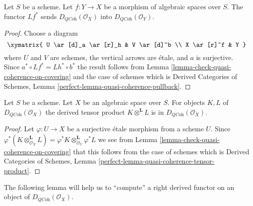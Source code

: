 \begin{lemma}
\label{lemma-quasi-coherence-pullback}
Let $S$ be a scheme.
Let $f : Y \to X$ be a morphism of algebraic spaces over $S$.
The functor $Lf^*$ sends $D_{\textit{QCoh}}(\mathcal{O}_X)$
into $D_{\textit{QCoh}}(\mathcal{O}_Y)$.
\end{lemma}

\begin{proof}
Choose a diagram
$$
\xymatrix{
U \ar[d]_a \ar[r]_h & V \ar[d]^b \\
X \ar[r]^f & Y
}
$$
where $U$ and $V$ are schemes, the vertical arrows are \'etale, and
$a$ is surjective. Since $a^* \circ Lf^* = Lh^* \circ b^*$ the result
follows from
Lemma \ref{lemma-check-quasi-coherence-on-covering}
and the case of schemes which is
Derived Categories of Schemes, Lemma
\ref{perfect-lemma-quasi-coherence-pullback}.
\end{proof}

\begin{lemma}
\label{lemma-quasi-coherence-tensor-product}
Let $S$ be a scheme. Let $X$ be an algebraic space over $S$.
For objects $K, L$ of $D_{\textit{QCoh}}(\mathcal{O}_X)$
the derived tensor product $K \otimes^\mathbf{L} L$ is in
$D_{\textit{QCoh}}(\mathcal{O}_X)$.
\end{lemma}

\begin{proof}
Let $\varphi : U \to X$ be a surjective \'etale morphism from a scheme $U$.
Since
$\varphi^*(K \otimes_{\mathcal{O}_X}^\mathbf{L} L) =
\varphi^*K \otimes_{\mathcal{O}_U}^\mathbf{L} \varphi^*L$
we see from
Lemma \ref{lemma-check-quasi-coherence-on-covering}
that this follows from the case of schemes which is
Derived Categories of Schemes, Lemma
\ref{perfect-lemma-quasi-coherence-tensor-product}.
\end{proof}

\noindent
The following lemma will help us to ``compute'' a right derived functor
on an object of $D_{\textit{QCoh}}(\mathcal{O}_X)$.

